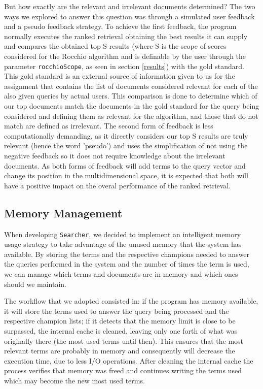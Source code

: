 \documentclass[12pt]{article}
\begin{document}
But how exactly are the relevant and irrelevant documents determined?
The two ways we explored to answer this question was through a simulated user 
feedback and a pseudo feedback strategy.
To achieve the first feedback, the program normally executes the ranked retrieval
obtaining the best results it can supply and compares the obtained top S results 
(where S is the scope of scores considered for the Rocchio algorithm and is 
definable by the user through the parameter \texttt{rocchioScope}, as seen in 
section \ref{results}) with the gold standard.
This gold standard is an external source of information given to us for the 
assignment that contains the list of documents considered relevant for each of
the also given queries by actual users.
This comparison is done to determine which of our top documents match the 
documents in the gold standard for the query being considered and defining them 
as relevant for the algorithm, and those that do not match are defined as irrelevant.
The second form of feedback is less computationally demanding, as it directly 
considers our top S results are truly relevant (hence the word 'pseudo') and 
uses the simplification of not using the negative feedback so it does not require
knowledge about the irrelevant documents.
As both forms of feedback will add terms to the query vector and change its 
position in the multidimensional space, it is expected that both will have a 
positive impact on the overal performance of the ranked retrieval.

\newpage
\subsection{Memory Management} \label{memory}

When developing \texttt{Searcher}, we decided to implement an intelligent memory
usage strategy to take advantage of the unused memory that the system has available. 
By storing the terms and the respective champions needed to answer the queries 
performed in the system and the number of times the term is used, we can manage 
which terms and documents are in memory and which ones should we maintain.

The workflow that we adopted consisted in: if the program has memory available, 
it will store the terms used to answer the query being processed and the 
respective champion lists; if it detects that the memory limit is close to be 
surpassed, the internal cache is cleaned, leaving only one forth of what was 
originally there (the most used terms until then). 
This ensures that the most relevant terms are probably in memory and consequently 
will decrease the execution time, due to less I/O operations. 
After cleaning the internal cache the process verifies that memory was freed and 
continues writing the terms used which may become the new most used terms.
\end{document}
